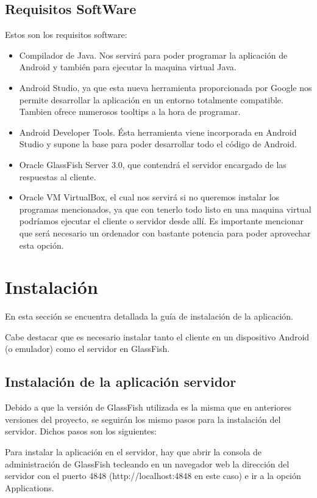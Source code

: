 \subsection{Requisitos SoftWare}

Estos son los requisitos software:

\begin{itemize}
\item Compilador de Java. Nos servirá para poder programar la aplicación de Android y también para ejecutar la maquina virtual Java.
\item Android Studio, ya que esta nueva herramienta proporcionada por Google nos permite desarrollar la aplicación en un entorno totalmente compatible. Tambien ofrece numerosos tooltips a la hora de programar.
\item Android Developer Tools. Ésta herramienta viene incorporada en Android Studio y supone la base para poder desarrollar todo el código de Android.
\item Oracle GlassFish Server 3.0, que contendrá el servidor encargado de las respuestas al cliente.
\item Oracle VM VirtualBox, el cual nos servirá si no queremos instalar los programas mencionados, ya que con tenerlo todo listo en una maquina virtual podríamos ejecutar el cliente o servidor desde allí. Es importante mencionar que será necesario un ordenador con bastante potencia para poder aprovechar esta opción.
\end{itemize}

\section{Instalación}

En esta sección se encuentra detallada la guía de instalación de la aplicación.

Cabe destacar que es necesario instalar tanto el cliente en un dispositivo Android (o emulador) como el servidor en GlassFish.

\subsection{Instalación de la aplicación servidor}

Debido a que la versión de GlassFish utilizada es la misma que en anteriores versiones del proyecto, se seguirán los mismo pasos para la instalación del servidor. Dichos pasos son los siguientes:

Para instalar la aplicación en el servidor, hay que abrir la consola de administración de GlassFish tecleando en un navegador web la dirección del servidor con el puerto 4848 (http://localhost:4848 en este caso) e ir a la opción Applications.

